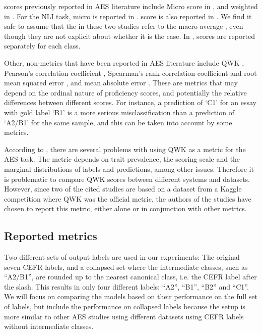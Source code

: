 \FI scores previously reported in \ac{AES} literature include Micro \FI score
in \textcite{vajjala17}, and weighted \FI in
\textcite{vajjala18universalCEFR}. For the \ac{NLI} task, micro \FI is
reported in \textcite{malmasi15,malmasi17}. \FI score is also reported in
\textcite{hancke2013,pilan2016}. We find it safe to assume that the \FI in
these two studies refer to the macro average \FI, even though they are not
explicit about whether it is the case. In \textcite{vajjalaloo2014}, \FI
scores are reported separately for each class.

Other, non-\FI metrics that have been reported in \ac{AES} literature include
\ac{QWK} \autocite{taghipour16, alikaniotis2016automatic}, Pearson's
correlation coefficient \autocite{vajjala17, alikaniotis2016automatic},
Spearman's rank correlation coefficient and root mean squared error
\autocite{alikaniotis2016automatic}, and mean absolute error
\autocite{vajjala17}. These are metrics that may depend on the ordinal nature
of proficiency scores, and potentially the relative differences between
different scores. For instance, a prediction of `C1' for an essay with gold
label `B1' is a more serious misclassification than a prediction of `A2/B1'
for the same sample, and this can be taken into account by some metrics.

According to \textcite{yannakoudakis2015evaluating}, there are several
problems with using \ac{QWK} as a metric for the \ac{AES} task. The metric
depends on trait prevalence, the scoring scale and the marginal distributions
of labels and predictions, among other issues. Therefore it is problematic to
compare \ac{QWK} scores between different systems and datasets. However,
since two of the cited studies are based on a dataset from a Kaggle
competition where \ac{QWK} was the official metric, the authors of the
studies have chosen to report this metric, either alone or in conjunction
with other metrics.


\subsection{Reported metrics}

Two different sets of output labels are used in our experiments: The original
seven CEFR labels, and a collapsed set where the intermediate classes, such
as ``A2/B1'', are rounded up to the nearest canonical class, i.e. the CEFR
label after the slash. This results in only four different labels: ``A2'',
``B1'', ``B2'' and ``C1''. We will focus on comparing the models based on
their performance on the full set of labels, but include the performance on
collapsed labels because the setup is more similar to other \ac{AES} studies
using different datasets using CEFR labels without intermediate classes.

